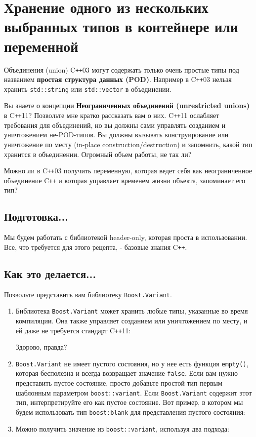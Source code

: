 \documentclass[a4paper, 12pt]{article} %
\begin{document}
\clearpage

\section*{Хранение одного из нескольких выбранных типов в контейнере или переменной}
Объединения (union) C\texttt{++}03 могут содержать только очень простые типы под названием \textbf{простая структура данных (POD)}. Например в C\texttt{++}03 нельзя хранить \texttt{std::string} или \texttt{std::vector} в объединении.

Вы знаете о концепции \textbf{Неограниченных объединений (unrestricted unions)} в C\texttt{++}11? Позвольте мне кратко рассказать вам о них. C\texttt{++}11 ослабляет требования для объединений, но вы должны сами управлять созданием и уничтожением не-POD-типов. Вы должны вызывать конструирование или уничтожение по месту (in-place construction/destruction) и запомнить, какой тип хранится в объединении. Огромный объем работы, не так ли?

Можно ли в C\texttt{++}03 получить переменную, которая ведет себя как неограниченное объединение C\texttt{++} и которая управляет временем жизни объекта, запоминает его тип?

\subsection*{Подготовка...}
Мы будем работать с библиотекой header-only, которая проста в использовании. Все, что требуется для этого рецепта, - базовые знания C\texttt{++}.
\subsection*{Как это делается...}
Позвольте представить вам библиотеку \texttt{Boost.Variant}.

\begin{enumerate}
    \item Библиотека \texttt{Boost.Variant} может хранить любые типы, указанные во время компиляции. Она также управляет созданием или уничтожением по месту, и ей даже не требуется стандарт C\texttt{++}11:
          
          Здорово, правда?
    \item \texttt{Boost.Variant} не имеет пустого состояния, но у нее есть функция \texttt{empty()}, которая бесполезна и всегда возвращает значение \texttt{false}. Если вам нужно представить пустое состояние, просто добавьте простой тип первым шаблонным параметром \texttt{boost::variant}. Если \texttt{Boost.Variant} содержит этот тип, интерпретируйте его как пустое состояние. Вот пример, в котором мы будем использовать тип \texttt{boost:blank} для представления пустого состояния:
          
    \item Можно получить значение из \texttt{boost::variant}, используя два подхода:
          
\end{enumerate}
\end{document}
